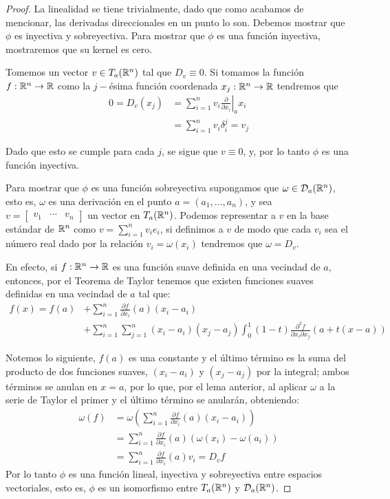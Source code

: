 \begin{proof}
	La linealidad se tiene trivialmente, dado que como acabamos de mencionar, las derivadas direccionales en un punto lo son. Debemos mostrar que $\phi$ es inyectiva y sobreyectiva. Para mostrar que $\phi$ es una función inyectiva, mostraremos que su kernel es cero.

	Tomemos un vector $v \in T_a(\mathbb{R}^n)$ tal que $D_v \equiv 0$. Si tomamos la función $f: \mathbb{R}^n \to \mathbb{R}$ como la $j-$ésima función coordenada $x_j: \mathbb{R}^n \to \mathbb{R}$ tendremos que
	\begin{align*}
		0 = D_v(x_j) & = \left. \sum_{i=1}^{n} v_i \frac{\partial}{\partial x_i} \right|_{a} x_i \\
		             & = \sum_{i=1}^{n} v_i \delta_i^j = v_j
	\end{align*}

	Dado que esto se cumple para cada $j$, se sigue que $v \equiv 0$, y, por lo tanto $\phi$ es una función inyectiva.

	Para mostrar que $\phi$ es una función sobreyectiva supongamos que $\omega \in \mathcal{D}_a(\mathbb{R}^n)$, esto es, $\omega$ es una derivación en el punto $a = (a_1, \dots, a_n)$, y sea $v = \begin{bmatrix} v_1 & \cdots & v_n \end{bmatrix}$ un vector en $T_a(\mathbb{R}^n)$. Podemos representar a $v$ en la base estándar de $\mathbb{R}^n$ como $v = \sum_{i=1}^{n} v_i e_i$, si definimos a $v$ de modo que cada $v_i$ sea el número real dado por la relación $v_i = \omega(x_i)$ tendremos que $\omega = D_v$.

	En efecto, si $f: \mathbb{R}^n \to \mathbb{R}$ es una función suave definida en una vecindad de $a$, entonces, por el Teorema de Taylor tenemos que existen funciones suaves definidas en una vecindad de $a$ tal que:
  \begin{align*}
    f(x) = f(a) 
    &+ \sum_{i=1}^{n} \frac{\partial f}{\partial x_i} (a) (x_i - a_i) \\
    &+ \sum_{i=1}^{n} \sum_{j=1}^{n} (x_i - a_i)(x_j - a_j) \int_{0}^{1} (1-t) \frac{\partial^2 f}{\partial x_i \partial x_j} (a + t(x - a))
  \end{align*}

	Notemos lo siguiente, $f(a)$ es una constante y el último término es la suma del producto de dos funciones suaves, $(x_i - a_i)$ y $(x_j - a_j)$ por la integral; ambos términos se anulan en $x = a$, por lo que, por el lema anterior, al aplicar $\omega$ a la serie de Taylor el primer y el último término se anularán, obteniendo:
	\begin{align*}
		\omega(f) & = \omega(\sum_{i=1}^{n} \frac{\partial f}{\partial x_i} (a )(x_i - a_i))        \\
		          & = \sum_{i=1}^{n} \frac{\partial f}{\partial x_i} (a)(\omega(x_i) - \omega(a_i)) \\
		          & = \sum_{i=1}^{n} \frac{\partial f}{\partial x_i}(a) v_i = D_v f
	\end{align*}
	Por lo tanto $\phi$ es una función lineal, inyectiva y sobreyectiva entre espacios vectoriales, esto es, $\phi$ es un isomorfismo entre $T_a(\mathbb{R}^n)$ y $\mathcal{D}_a(\mathbb{R}^n)$.
\end{proof}

